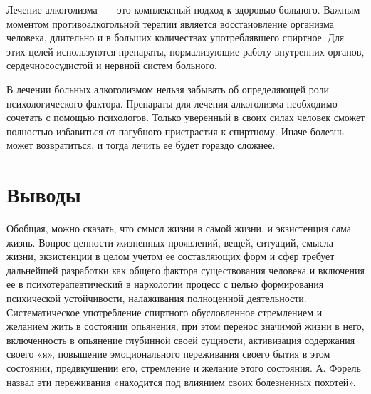 \documentclass[14pt]{extarticle}
\begin{document}
Лечение алкоголизма~---~это комплексный подход к здоровью больного. Важным моментом противоалкогольной терапии является восстановление организма человека, длительно и в больших количествах употреблявшего спиртное. Для этих целей используются препараты, нормализующие работу внутренних органов, сердечнососудистой и нервной систем больного.

В лечении больных алкоголизмом нельзя забывать об определяющей роли психологического фактора. Препараты для лечения алкоголизма необходимо сочетать с помощью психологов. Только уверенный в своих силах человек сможет полностью избавиться от пагубного пристрастия к спиртному. Иначе болезнь может возвратиться, и тогда лечить ее будет гораздо сложнее.
\section{Выводы}

Обобщая, можно сказать, что смысл жизни в самой жизни, и экзистенция сама жизнь. Вопрос ценности жизненных проявлений, вещей, ситуаций, смысла жизни, экзистенции в целом учетом ее составляющих форм и сфер требует дальнейшей разработки как общего фактора существования человека и включения ее в психотерапевтический в наркологии процесс с целью формирования психической устойчивости, налаживания полноценной деятельности. Систематическое употребление спиртного обусловленное стремлением и желанием жить в состоянии опьянения, при этом перенос значимой жизни в него, включенность в опьянение глубинной своей сущности, активизация содержания своего «я», повышение эмоционального переживания своего бытия в этом состоянии, предвкушении его, стремление и желание этого состояния. А. Форель назвал эти переживания «находится под влиянием своих болезненных похотей».
\end{document}
